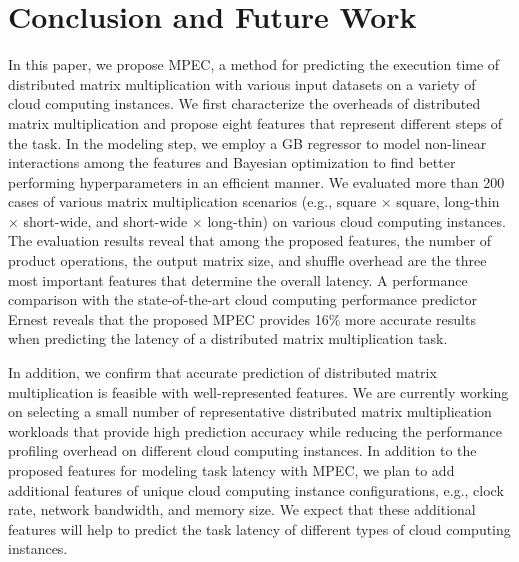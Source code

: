 \documentclass[10pt, conference, compsocconf]{IEEEtran}
\begin{document}
\section{Conclusion and Future Work}
In this paper, we propose MPEC, a method for predicting the execution time of distributed matrix multiplication with various input datasets on a variety of cloud computing instances. We first characterize the overheads of distributed matrix multiplication and propose eight features that represent different steps of the task. In the modeling step, we employ a GB regressor to model non-linear interactions among the features and Bayesian optimization to find better performing hyperparameters in an efficient manner. We evaluated more than 200 cases of various matrix multiplication scenarios (e.g., square $\times$ square, long-thin $\times$ short-wide, and short-wide $\times$ long-thin) on various cloud computing instances. The evaluation results reveal that among the proposed features, the number of product operations, the output matrix size, and shuffle overhead are the three most important features that determine the overall latency. A performance comparison with the state-of-the-art cloud computing performance predictor Ernest reveals that the proposed MPEC provides 16\% more accurate results when predicting the latency of a distributed matrix multiplication task.

In addition, we confirm that accurate prediction of distributed matrix multiplication is feasible with well-represented features. We are currently working on selecting a small number of representative distributed matrix multiplication workloads that provide high prediction accuracy while reducing the performance profiling overhead on different cloud computing instances. In addition to the proposed features for modeling task latency with MPEC, we plan to add additional features of unique cloud computing instance configurations, e.g., clock rate, network bandwidth, and memory size. We expect that these additional features will help to predict the task latency of different types of cloud computing instances.


\end{document}
